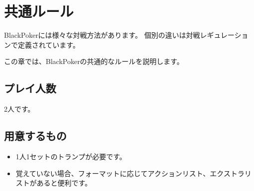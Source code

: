 \documentclass[letterpaper,10pt,dvipdfmx]{sphinxmanual}
\begin{document}
\sphinxstepscope


\chapter{共通ルール}
\label{\detokenize{common/common:common-rst}}\label{\detokenize{common/common:id1}}\label{\detokenize{common/common::doc}}
\sphinxAtStartPar
BlackPokerには様々な対戦方法があります。
個別の違いは対戦レギュレーションで定義されています。

\sphinxAtStartPar
この章では、BlackPokerの共通的なルールを説明します。


\section{プレイ人数}
\label{\detokenize{common/common:id2}}
\sphinxAtStartPar
2人です。


\section{用意するもの}
\label{\detokenize{common/common:id3}}\begin{itemize}
\item {} 
\sphinxAtStartPar
1人1セットのトランプが必要です。

\item {} 
\sphinxAtStartPar
覚えていない場合、フォーマットに応じてアクションリスト、エクストラリストがあると便利です。

\end{itemize}
\end{document}
